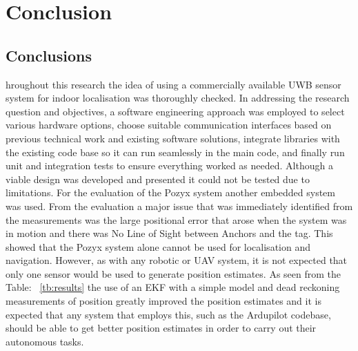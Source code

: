 \chapter{Conclusion}\label{ch:conclusion}
\section{Conclusions}\label{sec:conclusions}
hroughout this research the idea of using a commercially available UWB sensor system for indoor localisation was thoroughly checked.
In addressing the research question and objectives, a software engineering approach was employed to select various hardware options, choose suitable communication interfaces based on previous technical work and existing software solutions,
integrate libraries with the existing code base so it can run seamlessly in the main code, and finally run unit and integration tests to ensure everything worked as needed.
Although a viable design was developed and presented it could not be tested due to limitations.
For the evaluation of the Pozyx system another embedded system was used.
From the evaluation a major issue that was immediately identified from the measurements was the large positional error that arose when the system was in motion and there was No Line of Sight between Anchors and the tag.
This showed that the Pozyx system alone cannot be used for localisation and navigation.
However, as with any robotic or UAV system, it is not expected that only one sensor would be used to generate position estimates.
As seen from the Table: ~\ref{tb:results} the use of an EKF with a simple model and dead reckoning measurements of position greatly improved the position estimates and it is expected that any system that employs this, such as the Ardupilot codebase, should be able to get better position estimates in order to carry out
their autonomous tasks.

